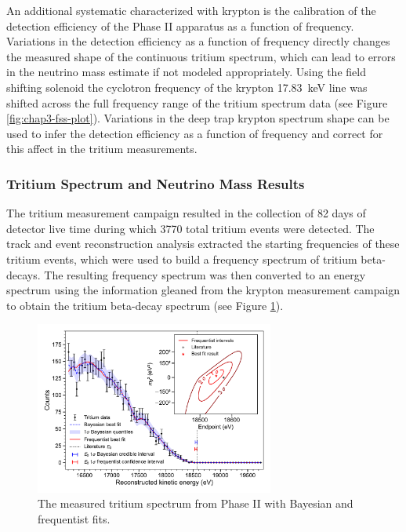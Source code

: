 An additional systematic characterized with krypton is the calibration of the detection efficiency of the Phase II apparatus as a function of frequency. Variations in the detection efficiency as a function of frequency directly changes the measured shape of the continuous tritium spectrum, which can lead to errors in the neutrino mass estimate if not modeled appropriately. Using the field shifting solenoid the cyclotron frequency of the krypton 17.83~keV line was shifted across the full frequency range of the tritium spectrum data (see Figure \ref{fig:chap3-fss-plot}). Variations in the deep trap krypton spectrum shape can be used to infer the detection efficiency as a function of frequency and correct for this affect in the tritium measurements.

\subsubsection*{Tritium Spectrum and Neutrino Mass Results}

The tritium measurement campaign resulted in the collection of 82 days of detector live time during which 3770 total tritium events were detected. The track and event reconstruction analysis extracted the starting frequencies of these tritium events, which were used to build a frequency spectrum of tritium beta-decays. The resulting frequency spectrum was then converted to an energy spectrum using the information gleaned from the krypton measurement campaign to obtain the tritium beta-decay spectrum (see Figure \ref{fig:chap3-final-tritium-fit}).
\begin{figure}
    \centering
    \includegraphics[width=0.7\textwidth]{figs/Chapter-3/12-03-22A_final_E0_real_data_phase_II_tritium_fit_1d.pdf}
    \caption{The measured tritium spectrum from Phase II with Bayesian and frequentist fits.}
    \label{fig:chap3-final-tritium-fit}
\end{figure}

